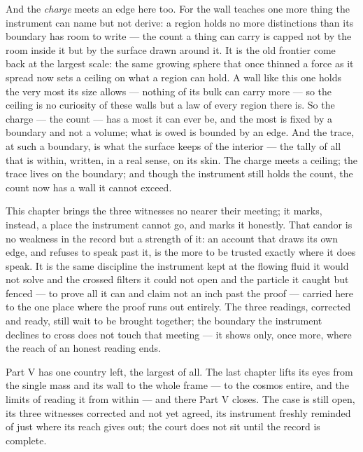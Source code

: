 And the \emph{charge} meets an edge here too. For the wall teaches one more thing the instrument can name but
not derive: a region holds no more distinctions than its boundary has room to write --- the count a thing can
carry is capped not by the room inside it but by the surface drawn around it. It is the old frontier come back
at the largest scale: the same growing sphere that once thinned a force as it spread now sets a ceiling on what
a region can hold. A wall like this one holds the very most its size allows --- nothing of its bulk can carry
more --- so the ceiling is no curiosity of these walls but a law of every region there is. So the charge --- the
count --- has a most it can ever be, and the most is fixed by a boundary and not a volume; what is owed is
bounded by an edge. And the trace, at such a boundary, is what the
surface keeps of the interior --- the tally of all that is within, written, in a real sense, on its skin. The
charge meets a ceiling; the trace lives on the boundary; and though the instrument still holds the count, the
count now has a wall it cannot exceed.

This chapter brings the three witnesses no nearer their meeting; it marks, instead, a place the instrument
cannot go, and marks it honestly. That candor is no weakness in the record but a strength of it: an account that
draws its own edge, and refuses to speak past it, is the more to be trusted exactly where it does speak. It is
the same discipline the instrument kept at the flowing fluid it would not solve and the crossed filters it could
not open and the particle it caught but fenced --- to prove all it can and claim not an inch past the proof ---
carried here to the one place where the proof runs out entirely. The
three readings, corrected and ready, still wait to be brought together; the boundary the instrument declines to
cross does not touch that meeting --- it shows only, once more, where the reach of an honest reading ends.

Part V has one country left, the largest of all. The last chapter lifts its eyes from the single mass and its
wall to the whole frame --- to the cosmos entire, and the limits of reading it from within --- and there Part V
closes. The case is still open, its three witnesses corrected and not yet agreed, its instrument freshly
reminded of just where its reach gives out; the court does not sit until the record is complete.

